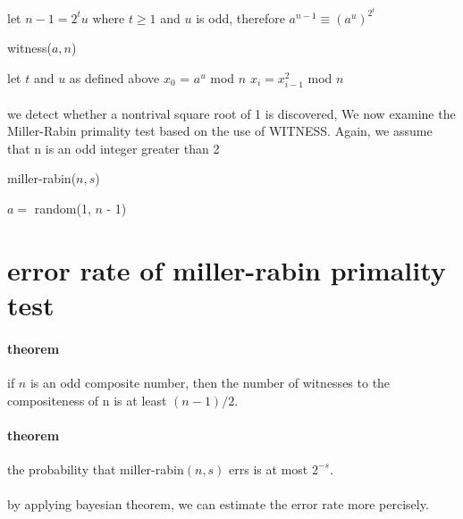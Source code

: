 \documentclass{article}
\begin{document}
  \paragraph{} let $n - 1 = 2^tu$ where $t \geq 1$ and $u$ is odd, therefore $a^{n - 1} \equiv (a^u)^{2^t}$
  \begin{algorithm}
    \caption{witness($a, n$)}
    \begin{algorithmic}[1]
      \State let $t$ and $u$ as defined above
      \State $x_0$ = $a^u$ mod $n$
        \State $x_i = x_{i - 1}^2$ mod $n$
          \State {}
        \EndIf
      \EndFor
        \State {}
      \EndIf
      \State {}
    \end{algorithmic}
  \end{algorithm}
  \paragraph{} we detect whether a nontrival square root of 1 is discovered, We now examine the Miller-Rabin primality test based on the use of WITNESS. Again, we assume that n is an odd integer greater than 2
  \begin{algorithm}
    \caption{miller-rabin($n, s$)}
    \begin{algorithmic}[1]
        \State $a = $ random(1, $n$ - 1)
          \State {}
        \EndIf
      \EndFor
      \State {}
    \end{algorithmic}
  \end{algorithm}
\section{error rate of miller-rabin primality test}
  \paragraph{theorem} if $n$ is an odd composite number, then the number of witnesses to the compositeness of n is at least $(n - 1) / 2$.
  \paragraph{theorem} the probability that miller-rabin$(n, s)$ errs is at most $2^{-s}$.
  \paragraph{} by applying bayesian theorem, we can estimate the error rate more percisely.
\end{document}
